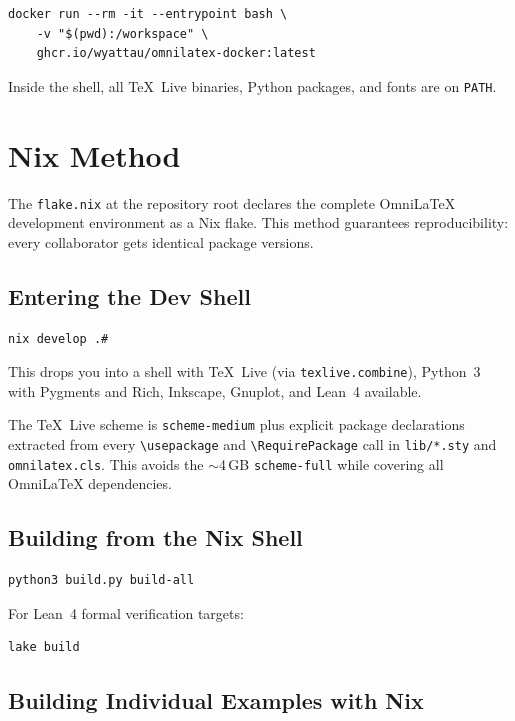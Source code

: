 \begin{verbatim}
docker run --rm -it --entrypoint bash \
    -v "$(pwd):/workspace" \
    ghcr.io/wyattau/omnilatex-docker:latest
\end{verbatim}

Inside the shell, all TeX~Live binaries, Python packages, and fonts are on
\texttt{PATH}.

\section{Nix Method}

The \texttt{flake.nix} at the repository root declares the complete OmniLaTeX
development environment as a Nix flake.  This method guarantees reproducibility:
every collaborator gets identical package versions.

\subsection{Entering the Dev Shell}

\begin{verbatim}
nix develop .#
\end{verbatim}

This drops you into a shell with TeX~Live (via \texttt{texlive.combine}),
Python~3 with Pygments and Rich, Inkscape, Gnuplot, and Lean~4 available.

The TeX~Live scheme is \texttt{scheme-medium} plus explicit package
declarations extracted from every \texttt{\textbackslash usepackage} and
\texttt{\textbackslash RequirePackage} call in \texttt{lib/*.sty} and
\texttt{omnilatex.cls}.  This avoids the $\sim$4\,GB \texttt{scheme-full}
while covering all OmniLaTeX dependencies.

\subsection{Building from the Nix Shell}

\begin{verbatim}
python3 build.py build-all
\end{verbatim}

For Lean~4 formal verification targets:

\begin{verbatim}
lake build
\end{verbatim}

\subsection{Building Individual Examples with Nix}

